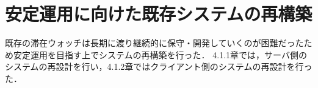 





\section{安定運用に向けた既存システムの再構築}\label{4.1}

既存の滞在ウォッチは長期に渡り継続的に保守・開発していくのが困難だったため安定運用を目指す上でシステムの再構築を行った．
4.1.1章では，サーバ側のシステムの再設計を行い，4.1.2章ではクライアント側のシステムの再設計を行った．














